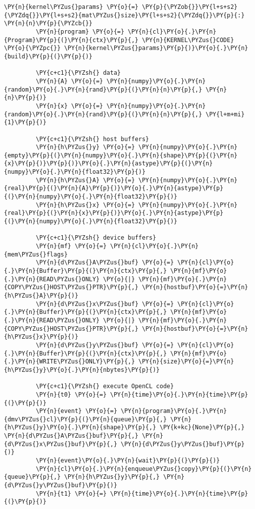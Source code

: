 \begin{Verbatim}[commandchars=\\\{\}]
         \PY{n}{kernel\PYZus{}params} \PY{o}{=} \PY{p}{\PYZob{}}\PY{l+s+s2}{\PYZdq{}}\PY{l+s+s2}{mat\PYZus{}size}\PY{l+s+s2}{\PYZdq{}}\PY{p}{:} \PY{n}{n}\PY{p}{\PYZcb{}}
         \PY{n}{program} \PY{o}{=} \PY{n}{cl}\PY{o}{.}\PY{n}{Program}\PY{p}{(}\PY{n}{ctx}\PY{p}{,} \PY{n}{KERNEL\PYZus{}CODE} \PY{o}{\PYZpc{}} \PY{n}{kernel\PYZus{}params}\PY{p}{)}\PY{o}{.}\PY{n}{build}\PY{p}{(}\PY{p}{)}
         
         \PY{c+c1}{\PYZsh{} data}
         \PY{n}{A} \PY{o}{=} \PY{n}{numpy}\PY{o}{.}\PY{n}{random}\PY{o}{.}\PY{n}{rand}\PY{p}{(}\PY{n}{n}\PY{p}{,} \PY{n}{n}\PY{p}{)}
         \PY{n}{x} \PY{o}{=} \PY{n}{numpy}\PY{o}{.}\PY{n}{random}\PY{o}{.}\PY{n}{rand}\PY{p}{(}\PY{n}{n}\PY{p}{,} \PY{l+m+mi}{1}\PY{p}{)}
         
         \PY{c+c1}{\PYZsh{} host buffers}
         \PY{n}{h\PYZus{}y} \PY{o}{=} \PY{n}{numpy}\PY{o}{.}\PY{n}{empty}\PY{p}{(}\PY{n}{numpy}\PY{o}{.}\PY{n}{shape}\PY{p}{(}\PY{n}{x}\PY{p}{)}\PY{p}{)}\PY{o}{.}\PY{n}{astype}\PY{p}{(}\PY{n}{numpy}\PY{o}{.}\PY{n}{float32}\PY{p}{)}
         \PY{n}{h\PYZus{}A} \PY{o}{=} \PY{n}{numpy}\PY{o}{.}\PY{n}{real}\PY{p}{(}\PY{n}{A}\PY{p}{)}\PY{o}{.}\PY{n}{astype}\PY{p}{(}\PY{n}{numpy}\PY{o}{.}\PY{n}{float32}\PY{p}{)}
         \PY{n}{h\PYZus{}x} \PY{o}{=} \PY{n}{numpy}\PY{o}{.}\PY{n}{real}\PY{p}{(}\PY{n}{x}\PY{p}{)}\PY{o}{.}\PY{n}{astype}\PY{p}{(}\PY{n}{numpy}\PY{o}{.}\PY{n}{float32}\PY{p}{)}
         
         \PY{c+c1}{\PYZsh{} device buffers}
         \PY{n}{mf} \PY{o}{=} \PY{n}{cl}\PY{o}{.}\PY{n}{mem\PYZus{}flags}
         \PY{n}{d\PYZus{}A\PYZus{}buf} \PY{o}{=} \PY{n}{cl}\PY{o}{.}\PY{n}{Buffer}\PY{p}{(}\PY{n}{ctx}\PY{p}{,} \PY{n}{mf}\PY{o}{.}\PY{n}{READ\PYZus{}ONLY} \PY{o}{|} \PY{n}{mf}\PY{o}{.}\PY{n}{COPY\PYZus{}HOST\PYZus{}PTR}\PY{p}{,} \PY{n}{hostbuf}\PY{o}{=}\PY{n}{h\PYZus{}A}\PY{p}{)}
         \PY{n}{d\PYZus{}x\PYZus{}buf} \PY{o}{=} \PY{n}{cl}\PY{o}{.}\PY{n}{Buffer}\PY{p}{(}\PY{n}{ctx}\PY{p}{,} \PY{n}{mf}\PY{o}{.}\PY{n}{READ\PYZus{}ONLY} \PY{o}{|} \PY{n}{mf}\PY{o}{.}\PY{n}{COPY\PYZus{}HOST\PYZus{}PTR}\PY{p}{,} \PY{n}{hostbuf}\PY{o}{=}\PY{n}{h\PYZus{}x}\PY{p}{)}
         \PY{n}{d\PYZus{}y\PYZus{}buf} \PY{o}{=} \PY{n}{cl}\PY{o}{.}\PY{n}{Buffer}\PY{p}{(}\PY{n}{ctx}\PY{p}{,} \PY{n}{mf}\PY{o}{.}\PY{n}{WRITE\PYZus{}ONLY}\PY{p}{,} \PY{n}{size}\PY{o}{=}\PY{n}{h\PYZus{}y}\PY{o}{.}\PY{n}{nbytes}\PY{p}{)}
         
         \PY{c+c1}{\PYZsh{} execute OpenCL code}
         \PY{n}{t0} \PY{o}{=} \PY{n}{time}\PY{o}{.}\PY{n}{time}\PY{p}{(}\PY{p}{)}
         \PY{n}{event} \PY{o}{=} \PY{n}{program}\PY{o}{.}\PY{n}{dmv\PYZus{}cl}\PY{p}{(}\PY{n}{queue}\PY{p}{,} \PY{n}{h\PYZus{}y}\PY{o}{.}\PY{n}{shape}\PY{p}{,} \PY{k+kc}{None}\PY{p}{,} \PY{n}{d\PYZus{}A\PYZus{}buf}\PY{p}{,} \PY{n}{d\PYZus{}x\PYZus{}buf}\PY{p}{,} \PY{n}{d\PYZus{}y\PYZus{}buf}\PY{p}{)}
         \PY{n}{event}\PY{o}{.}\PY{n}{wait}\PY{p}{(}\PY{p}{)}
         \PY{n}{cl}\PY{o}{.}\PY{n}{enqueue\PYZus{}copy}\PY{p}{(}\PY{n}{queue}\PY{p}{,} \PY{n}{h\PYZus{}y}\PY{p}{,} \PY{n}{d\PYZus{}y\PYZus{}buf}\PY{p}{)}
         \PY{n}{t1} \PY{o}{=} \PY{n}{time}\PY{o}{.}\PY{n}{time}\PY{p}{(}\PY{p}{)}
         

\end{Verbatim}
